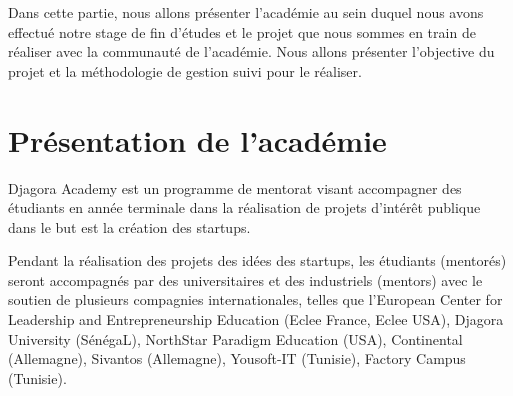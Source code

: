

Dans cette partie, nous allons présenter l'académie 
au sein duquel nous avons effectué notre stage de fin d'études et le projet
 que nous sommes en train de réaliser avec la communauté
de l'académie. Nous allons présenter l'objective du projet et la méthodologie de
gestion suivi pour le réaliser.

\section{Présentation de l'académie}

Djagora Academy est un programme de mentorat visant accompagner des étudiants
en année terminale dans la réalisation de projets d'intérêt publique dans le but
est la création des startups.

Pendant la réalisation des projets des idées des startups, les étudiants
(mentorés)  seront accompagnés par des universitaires et des industriels
(mentors) avec le soutien de plusieurs compagnies internationales, telles que
l'European Center for Leadership and Entrepreneurship Education (Eclee France,
Eclee USA), Djagora University (SénégaL), NorthStar Paradigm Education (USA),
Continental (Allemagne), Sivantos (Allemagne), Yousoft-IT (Tunisie),
Factory Campus (Tunisie).



